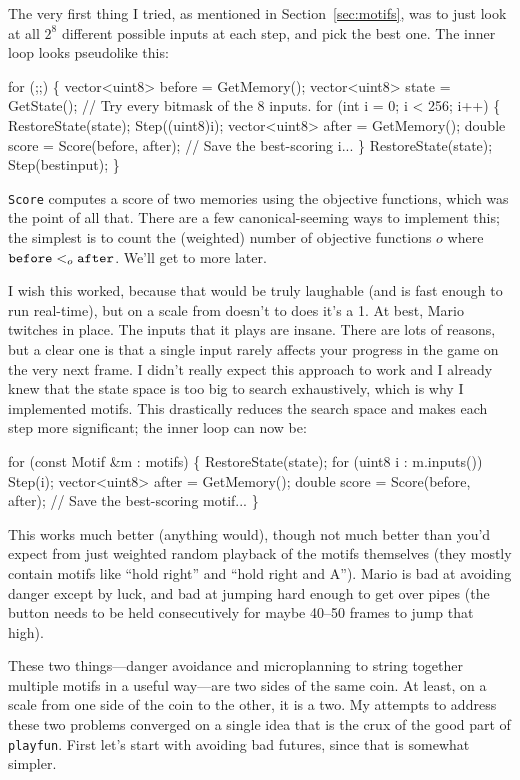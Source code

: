 \documentclass[twocolumn]{article}
\begin{document}
The very first thing I tried, as mentioned in
Section~\ref{sec:motifs}, was to just look at all $2^8$ different
possible inputs at each step, and pick the best one. The inner loop
looks pseudolike this:

\begin{code}
for (;;) \{
  vector<uint8> before = GetMemory();
  vector<uint8> state = GetState();
  // Try every bitmask of the 8 inputs.
  for (int i = 0; i < 256; i++) \{
    RestoreState(state);
    Step((uint8)i);
    vector<uint8> after = GetMemory();
    double score = Score(before, after);
    // Save the best-scoring i...
  \}
  RestoreState(state);
  Step(bestinput);
\}
\end{code}

{\tt Score} computes a score of two memories using the objective
functions, which was the point of all that. There are a few
canonical-seeming ways to implement this; the simplest is to
count the (weighted) number of objective functions $o$ where
${\tt before} <_o {\tt after}$. We'll get to more later.

I wish this worked, because that would be truly laughable (and is fast
enough to run real-time), but on a scale from doesn't to does it's a
1. At best, Mario twitches in place. The inputs that it plays are
insane. There are lots of reasons, but a clear one is that a single
input rarely affects your progress in the game on the very next frame.
I didn't really expect this approach to work and I already knew that
the state space is too big to search exhaustively, which is why I
implemented motifs. This drastically reduces the search space and
makes each step more significant; the inner loop can now be:

\begin{code}
for (const Motif &m : motifs) \{
  RestoreState(state);
  for (uint8 i : m.inputs()) Step(i);
  vector<uint8> after = GetMemory();
  double score = Score(before, after);
  // Save the best-scoring motif...
\}
\end{code}

This works much better (anything would), though not much better than
you'd expect from just weighted random playback of the motifs
themselves (they mostly contain motifs like ``hold right'' and ``hold
right and A''). Mario is bad at avoiding danger except by luck, and
bad at jumping hard enough to get over pipes (the button needs to be
held consecutively for maybe 40--50 frames to jump that high).

These two things---danger avoidance and microplanning to string
together multiple motifs in a useful way---are two sides of the same
coin. At least, on a scale from one side of the coin to the other, it
is a two. My attempts to address these two problems converged on a
single idea that is the crux of the good part of {\tt playfun}. First
let's start with avoiding bad futures, since that is somewhat simpler.
\end{document}
